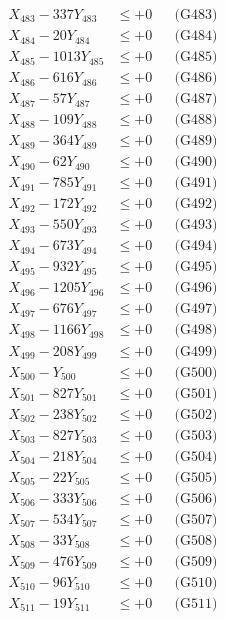 \documentclass[a4paper,10pt]{article}
\begin{document}
{\begin{align}
X_{483} - 337Y_{483} &\leq +0 && \text{(G483)} \\
X_{484} - 20Y_{484} &\leq +0 && \text{(G484)} \\
X_{485} - 1013Y_{485} &\leq +0 && \text{(G485)} \\
X_{486} - 616Y_{486} &\leq +0 && \text{(G486)} \\
X_{487} - 57Y_{487} &\leq +0 && \text{(G487)} \\
X_{488} - 109Y_{488} &\leq +0 && \text{(G488)} \\
X_{489} - 364Y_{489} &\leq +0 && \text{(G489)} \\
X_{490} - 62Y_{490} &\leq +0 && \text{(G490)} \\
\allowbreak
X_{491} - 785Y_{491} &\leq +0 && \text{(G491)} \\
X_{492} - 172Y_{492} &\leq +0 && \text{(G492)} \\
X_{493} - 550Y_{493} &\leq +0 && \text{(G493)} \\
X_{494} - 673Y_{494} &\leq +0 && \text{(G494)} \\
X_{495} - 932Y_{495} &\leq +0 && \text{(G495)} \\
X_{496} - 1205Y_{496} &\leq +0 && \text{(G496)} \\
X_{497} - 676Y_{497} &\leq +0 && \text{(G497)} \\
X_{498} - 1166Y_{498} &\leq +0 && \text{(G498)} \\
X_{499} - 208Y_{499} &\leq +0 && \text{(G499)} \\
X_{500} - Y_{500} &\leq +0 && \text{(G500)} \\
\allowbreak
X_{501} - 827Y_{501} &\leq +0 && \text{(G501)} \\
X_{502} - 238Y_{502} &\leq +0 && \text{(G502)} \\
X_{503} - 827Y_{503} &\leq +0 && \text{(G503)} \\
X_{504} - 218Y_{504} &\leq +0 && \text{(G504)} \\
X_{505} - 22Y_{505} &\leq +0 && \text{(G505)} \\
X_{506} - 333Y_{506} &\leq +0 && \text{(G506)} \\
X_{507} - 534Y_{507} &\leq +0 && \text{(G507)} \\
X_{508} - 33Y_{508} &\leq +0 && \text{(G508)} \\
X_{509} - 476Y_{509} &\leq +0 && \text{(G509)} \\
X_{510} - 96Y_{510} &\leq +0 && \text{(G510)} \\
\allowbreak
X_{511} - 19Y_{511} &\leq +0 && \text{(G511)} \\

\end{align}}
\end{document}
